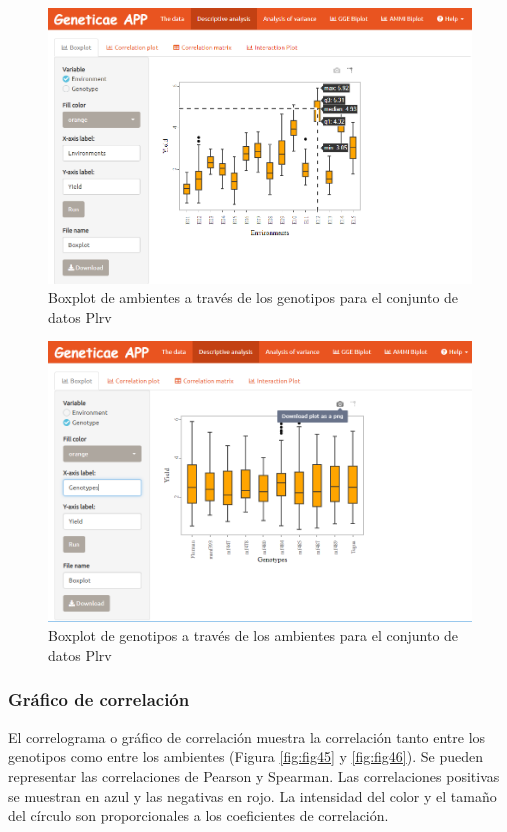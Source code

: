 \begin{figure}[H]
	\begin{center}
		\includegraphics[width=16cm]{./Graficos/Boxplot_environment.png}
	\end{center}
	\caption{Boxplot de ambientes a través de los genotipos para el conjunto de datos Plrv}
	\label{fig:fig43}
\end{figure}


\begin{figure}[H]
	\begin{center}
		\includegraphics[width=16cm]{./Graficos/Boxplot_genotypes.png}
	\end{center}
	\caption{Boxplot de genotipos a través de los ambientes para el conjunto de datos Plrv}
	\label{fig:fig44}
\end{figure}

\subsubsection{Gráfico de correlación}
El correlograma o gráfico de correlación muestra la correlación tanto entre los genotipos como entre los ambientes (Figura \ref{fig:fig45} y \ref{fig:fig46}). Se pueden representar las correlaciones de Pearson y Spearman. Las correlaciones positivas se muestran en azul y las negativas en rojo. La intensidad del color y el tamaño del círculo son proporcionales a los coeficientes de correlación. 


